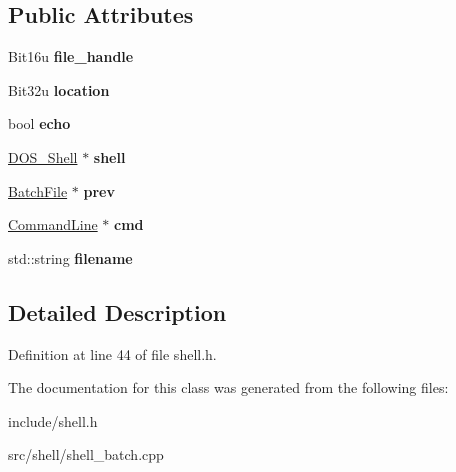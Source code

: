 \subsection*{Public Attributes}
\begin{DoxyCompactItemize}
\item 
\hypertarget{classBatchFile_a0e668547306df551eb7e70baa98241e9}{Bit16u {\bfseries file\-\_\-handle}}\label{classBatchFile_a0e668547306df551eb7e70baa98241e9}

\item 
\hypertarget{classBatchFile_aa9209ce7918ced6ce1a2fc59fff4b0c9}{Bit32u {\bfseries location}}\label{classBatchFile_aa9209ce7918ced6ce1a2fc59fff4b0c9}

\item 
\hypertarget{classBatchFile_ac6faaf367cb17424acd15724a58448ab}{bool {\bfseries echo}}\label{classBatchFile_ac6faaf367cb17424acd15724a58448ab}

\item 
\hypertarget{classBatchFile_a739d699f3d7abf36ae6e85ebe80d80b0}{\hyperlink{classDOS__Shell}{D\-O\-S\-\_\-\-Shell} $\ast$ {\bfseries shell}}\label{classBatchFile_a739d699f3d7abf36ae6e85ebe80d80b0}

\item 
\hypertarget{classBatchFile_a6369bd4d3b07b7661e49aaf43f4ed622}{\hyperlink{classBatchFile}{Batch\-File} $\ast$ {\bfseries prev}}\label{classBatchFile_a6369bd4d3b07b7661e49aaf43f4ed622}

\item 
\hypertarget{classBatchFile_a2b1bcf8ea0fb7f71633708a9886e67ee}{\hyperlink{classCommandLine}{Command\-Line} $\ast$ {\bfseries cmd}}\label{classBatchFile_a2b1bcf8ea0fb7f71633708a9886e67ee}

\item 
\hypertarget{classBatchFile_a2deea964df7496637a1843c66d174189}{std\-::string {\bfseries filename}}\label{classBatchFile_a2deea964df7496637a1843c66d174189}

\end{DoxyCompactItemize}


\subsection{Detailed Description}


Definition at line 44 of file shell.\-h.



The documentation for this class was generated from the following files\-:\begin{DoxyCompactItemize}
\item 
include/shell.\-h\item 
src/shell/shell\-\_\-batch.\-cpp\end{DoxyCompactItemize}
